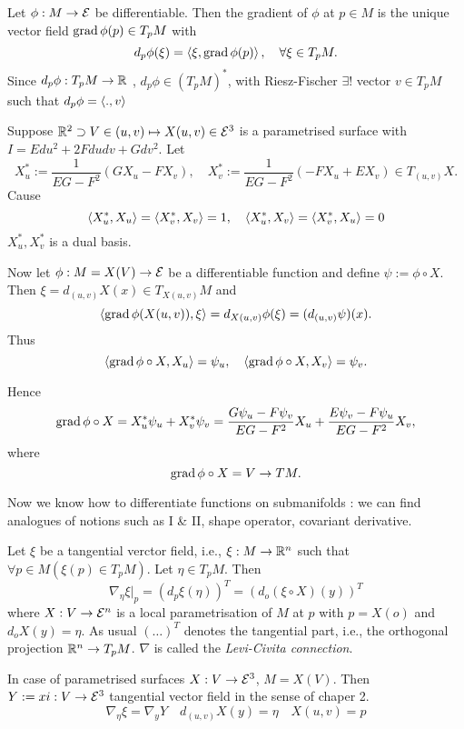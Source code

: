 \begin{definition}
	Let $\phi: M \to \mathcal E$ be differentiable. Then the gradient of $\phi$ at $p \in M$ is the unique vector field $\operatorname{grad} \phi(p) \in T_pM$ with
		\[ d_p\phi(\xi) = \left \langle \xi, \operatorname{grad} \phi(p) \right\rangle, \quad \forall \xi \in T_pM. \]
	Since  $d_p\phi : T_pM \to \mathbb R $ , $d_p \phi \in (T_pM)^*$, with Riesz-Fischer $\exists!$ vector $v \in T_pM$ such that $d_p\phi= \left \langle .,v \right\rangle$
\end{definition}

\begin{example}
	Suppose $\mathbb R^2 \supset V \in (u,v) \mapsto X(u,v) \in \mathcal E^3$ is a parametrised surface with $I= Edu^2 + 2Fdudv + Gdv^2$. Let
		\[ X_u^*:= \frac 1{EG-F^2}(GX_u-FX_v), \quad
			X_v^*:= \frac 1{EG-F^2} (-FX_u +EX_v) \in T_{(u,v)}X. \]
	Cause
		\[ \left \langle X_u^*,X_u \right\rangle = \left \langle X_v^*,X_v \right\rangle=1, \quad
			\left \langle X_u^*,X_v \right\rangle = \left \langle X_v^*,X_u \right\rangle =0 \]
	$X_u^*,X_v^*$ is a dual basis. 
	
	Now let $\phi : M= X(V) \to \mathcal E$ be a differentiable function and define $\psi := \phi \circ X$. Then $\xi = d_{(u,v)} X(x)  \in T_{X(u,v)}M$ and
		\[ \left \langle \operatorname{grad} \phi(X(u,v)), \xi \right\rangle = d_{X(u,v)}\phi(\xi) = (d_{(u,v)}\psi)(x). \]
	Thus 
		\[\left \langle  \operatorname{grad} \phi \circ X, X_u \right\rangle = \psi_u, \quad \left \langle  \operatorname{grad} \phi \circ X, X_v \right\rangle = \psi_v.\]
		
	Hence 
		\[ \operatorname{grad} \phi \circ X = X_u^*\psi_u + X_v^*\psi_v
			= \frac {G\psi_u - F\psi_v}{EG-F^2}X_u + \frac {E\psi_v - F\psi_u}{EG-F^2}X_v, \]
	where
		\[ \operatorname{grad} \phi \circ X = V \to TM. \]
\end{example}
	

Now we know how to differentiate functions on submanifolds : we can find analogues of notions such as I \& II, shape operator, covariant derivative.

\begin{definition}
	Let $  \xi $ be a tangential verctor field, i.e., $ \xi : M \rightarrow \mathbb R^n $ such that $ \forall p \in M(\xi(p) \in T_pM) $. Let $ \eta \in T_pM $. Then 	
		\[ \nabla_\eta \xi \big|_p = (d_p\xi(\eta))^T = (d_o(\xi \circ X)(y))^T \]
	where $ X: V \rightarrow \mathcal E^n $ is a local parametrisation of $ M $ at $ p $ with $ p = X(o) $ and $ d_oX(y) = \eta $. As usual $ (\dots)^T $ denotes the tangential part, i.e., the orthogonal projection $ \mathbb R^n \rightarrow T_pM $. $ \nabla $ is called the \emph{Levi-Civita connection}.
\end{definition}

\begin{remark}
	In case of parametrised surfaces $ X: V \rightarrow \mathcal E^3 $, $ M = X(V) $. Then $ Y:= xi : V \rightarrow \mathcal E^3 $ tangential vector field in the sense of chaper 2.
		\[ \nabla_\eta \xi = \nabla_yY \quad d_{(u,v)}X(y) = \eta \quad X(u,v) = p \] 
\end{remark}

